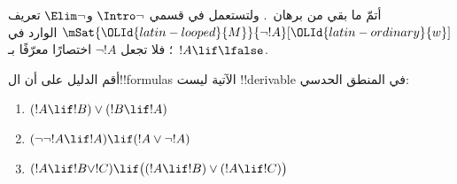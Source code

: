\documentclass[../../../include/open-logic-section]{subfiles}
\begin{document}
\begin{prob}
  أتمّ ما بقي من برهان~. ولتستعمل في قسمي
  $\Intro\lnot$ و$\Elim\lnot$ تعريف
  $\mSat{\OLId{latin-looped}{M}}{\lnot !A}[\OLId{latin-ordinary}{w}]$ الوارد في
  ؛ فلا تجعل
  $\lnot !A$ اختصارًا معرّفًا بـ~$!A \lif \lfalse$.
\end{prob}

\begin{prob}
  أقم الدليل على أن ال!!{formula}s الآتية ليست !!{derivable} في المنطق
  الحدسي:
  \begin{enumerate}
    \item $(!A \lif !B) \lor (!B \lif !A)$
    \item $(\lnot\lnot !A \lif !A) \lif (!A \lor \lnot !A)$
    \item $(!A \lif !B \lor !C) \lif \bigl((!A \lif !B)\lor(!A \lif !C)\bigr)$
  \end{enumerate}
\end{prob}
\end{document}

